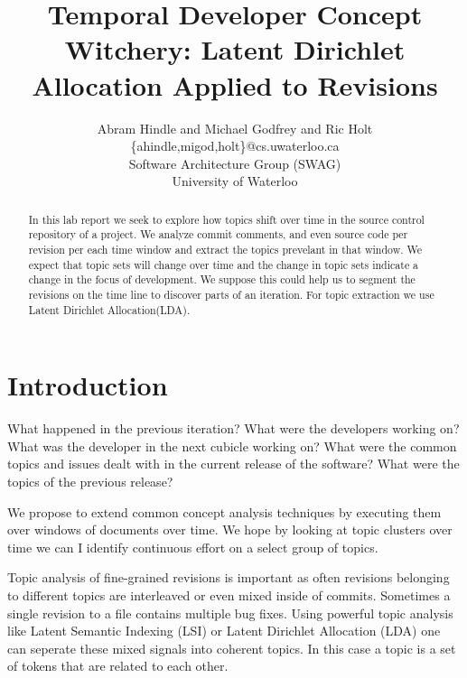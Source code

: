 \documentclass[times, 10pt,twocolumn]{article}
\author{Abram Hindle and Michael Godfrey and Ric Holt \\
\{ahindle,migod,holt\}@cs.uwaterloo.ca\\
Software Architecture Group (SWAG)\\
University of Waterloo\\
}
\title{Temporal Developer Concept Witchery: Latent Dirichlet Allocation Applied to Revisions}
\newcommand{\lda}{Latent Dirichlet Allocation}
\begin{document}
\maketitle
\begin{abstract}

  In this lab report we seek to explore how topics shift over time in
  the source control repository of a project. We analyze commit
  comments, and even source code per revision per each time window and
  extract the topics prevelant in that window. We expect that topic
  sets will change over time and the change in topic sets indicate a
  change in the focus of development. We suppose this could help us to
  segment the revisions on the time line to discover parts of an
  iteration. For topic extraction we use \lda (LDA).

\end{abstract}

\section{Introduction}



% 





What happened in the previous iteration? What were the developers
working on? What was the developer in the next cubicle working on?
What were the common topics and issues dealt with in the current
release of the software? What were the topics of the previous release?

We propose to extend common concept analysis techniques by executing
them over windows of documents over time. We hope by looking at topic
clusters over time we can I identify continuous effort on a select
group of topics.

Topic analysis of fine-grained revisions is important as often
revisions belonging to different topics are interleaved or even mixed
inside of commits.  Sometimes a single revision to a file contains
multiple bug fixes.  Using powerful topic analysis like Latent
Semantic Indexing (LSI) or Latent Dirichlet Allocation (LDA) one can
seperate these mixed signals into coherent topics. In this case a
topic is a set of tokens that are related to each other.
\end{document}
